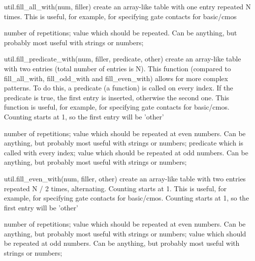 \begin{APIfunc}{util.fill\_all\_with(num, filler)}
    create an array-like table with one entry repeated N times. This is useful, for example, for specifying gate contacts for basic/cmos
    \begin{APIparameters}
            number of repetitions;
            value which should be repeated. Can be anything, but probably most useful with strings or numbers;
    \end{APIparameters}
\end{APIfunc}
\begin{APIfunc}{util.fill\_predicate\_with(num, filler, predicate, other)}
    create an array-like table with two entries (total number of entries is N). This function (compared to fill\_all\_with, fill\_odd\_with and fill\_even\_with) allows for more complex patterns. To do this, a predicate (a function) is called on every index. If the predicate is true, the first entry is inserted, otherwise the second one. This function is useful, for example, for specifying gate contacts for basic/cmos. Counting starts at 1, so the first entry will be 'other'
    \begin{APIparameters}
            number of repetitions;
            value which should be repeated at even numbers. Can be anything, but probably most useful with strings or numbers;
            predicate which is called with every index;
            value which should be repeated at odd numbers. Can be anything, but probably most useful with strings or numbers;
    \end{APIparameters}
\end{APIfunc}
\begin{APIfunc}{util.fill\_even\_with(num, filler, other)}
    create an array-like table with two entries repeated N / 2 times, alternating. Counting starts at 1. This is useful, for example, for specifying gate contacts for basic/cmos. Counting starts at 1, so the first entry will be 'other'
    \begin{APIparameters}
            number of repetitions;
            value which should be repeated at even numbers. Can be anything, but probably most useful with strings or numbers;
            value which should be repeated at odd numbers. Can be anything, but probably most useful with strings or numbers;
    \end{APIparameters}
\end{APIfunc}
